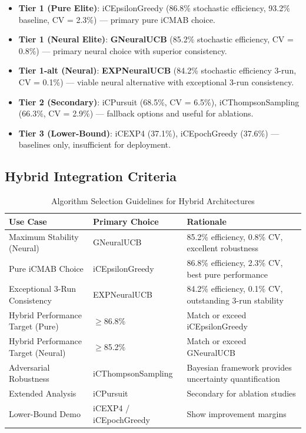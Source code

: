 \documentclass[12pt,a4paper]{article}
\newcommand{\legacy}[1]{\textcolor{legacycolor}{\textbf{#1}}}
\newcommand{\neural}[1]{\textcolor{neuralcolor}{\textbf{#1}}}
\begin{document}
\begin{itemize}
\item \textbf{Tier 1 (Pure Elite)}: iCEpsilonGreedy (86.8\% stochastic efficiency, 93.2\% baseline, CV = 2.3\%) --- primary pure iCMAB choice.
\item \textbf{Tier 1 (Neural Elite)}: \neural{GNeuralUCB} (85.2\% stochastic efficiency, CV = 0.8\%) --- primary neural choice with superior consistency.
\item \textbf{Tier 1-alt (Neural)}: \legacy{EXPNeuralUCB} (84.2\% stochastic efficiency 3-run, CV = 0.1\%) --- viable neural alternative with exceptional 3-run consistency.
\item \textbf{Tier 2 (Secondary)}: iCPursuit (68.5\%, CV = 6.5\%), iCThompsonSampling (66.3\%, CV = 2.9\%) --- fallback options and useful for ablations.
\item \textbf{Tier 3 (Lower-Bound)}: iCEXP4 (37.1\%), iCEpochGreedy (37.6\%) --- baselines only, insufficient for deployment.
\end{itemize}

\subsection{Hybrid Integration Criteria}

\begin{table}[H]
\centering
\caption{Algorithm Selection Guidelines for Hybrid Architectures}
\begin{tabular}{@{}lll@{}}
\toprule
\textbf{Use Case} & \textbf{Primary Choice} & \textbf{Rationale} \\
\midrule
Maximum Stability (Neural) & GNeuralUCB & 85.2\% efficiency, 0.8\% CV, excellent robustness \\
Pure iCMAB Choice & iCEpsilonGreedy & 86.8\% efficiency, 2.3\% CV, best pure performance \\
Exceptional 3-Run Consistency & EXPNeuralUCB & 84.2\% efficiency, 0.1\% CV, outstanding 3-run stability \\
Hybrid Performance Target (Pure) & $\geq$86.8\% & Match or exceed iCEpsilonGreedy \\
Hybrid Performance Target (Neural) & $\geq$85.2\% & Match or exceed GNeuralUCB \\
Adversarial Robustness & iCThompsonSampling & Bayesian framework provides uncertainty quantification \\
Extended Analysis & iCPursuit & Secondary for ablation studies \\
Lower-Bound Demo & iCEXP4 / iCEpochGreedy & Show improvement margins \\
\bottomrule
\end{tabular}
\end{table}
\end{document}
